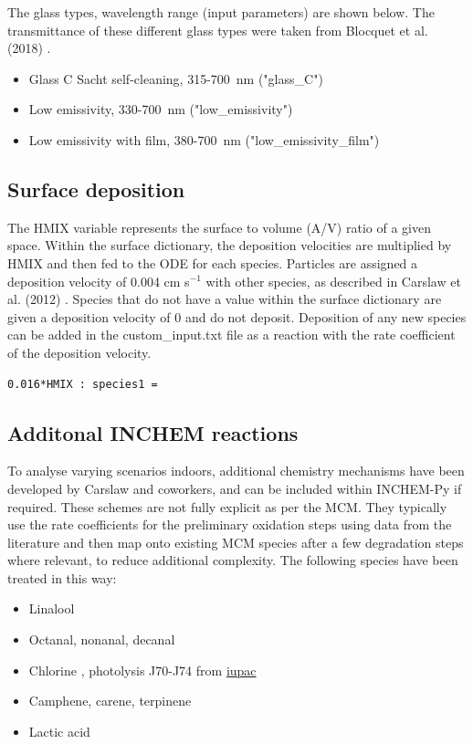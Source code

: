 \documentclass[a4paper]{refart}
\begin{document}
The glass types, wavelength range (input parameters) are shown below. The transmittance of these different glass types were taken from Blocquet et al. (2018) \cite{Blocquet2018}.
\begin{itemize}
    \item Glass C Sacht self-cleaning, 315-700~nm ("glass\_C")
    \item Low emissivity, 330-700~nm ("low\_emissivity")
    \item Low emissivity with film, 380-700~nm ("low\_emissivity\_film")
\end{itemize}

\subsection{Surface deposition}\label{surface_dictionary.py}
The HMIX variable represents the surface to volume (A/V) ratio of a given space. Within the surface dictionary, the deposition velocities are multiplied by HMIX and then fed to the ODE for each species. Particles are assigned a deposition velocity of 0.004 cm s$^{-1}$ with other species, as described in Carslaw et al. (2012) \cite{Carslaw2012}. Species that do not have a value within the surface dictionary are given a deposition velocity of 0 and do not deposit. Deposition of any new species can be added in the custom\_input.txt file as a reaction with the rate coefficient of the deposition velocity.
\begin{verbatim}
0.016*HMIX : species1 =
\end{verbatim}


\subsection{Additonal INCHEM reactions}\label{inchem_chemistry}
To analyse varying scenarios indoors, additional chemistry mechanisms have been developed by Carslaw and coworkers, and can be included within INCHEM-Py if required. These schemes are not fully explicit as per the MCM. They typically use the rate coefficients for the preliminary oxidation steps using data from the literature and then map onto existing MCM species after a few degradation steps where relevant, to reduce additional complexity. The following species have been treated in this way:
\begin{itemize}
    \item Linalool \cite{Carslaw2017}
    \item Octanal, nonanal, decanal \cite{Kruza2017}
    \item Chlorine \cite{Xue2015,Wong2017,Wang2020}, photolysis J70-J74 from \href{http://iupac.pole-ether.fr}{iupac}
    \item Camphene, carene, terpinene \cite{Carslaw2007}
    \item Lactic acid
\end{itemize}
\end{document}
